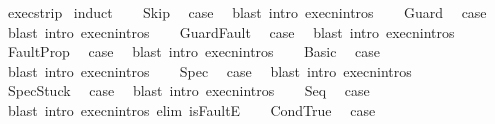 \begin{isabellebody}
\ exec{\isacharunderscore}strip\isanewline
{}\isamarkupfalse%
\ {\isacharparenleft}induct{\isacharparenright}\isanewline
\ \ \isamarkupfalse%
\ Skip\ \isamarkupfalse%
\ {\isacharquery}case\ \isamarkupfalse%
\ {\isacharparenleft}blast\ intro{\isacharcolon}\ execn{\isachardot}intros{\isacharparenright}\isanewline
{}\isamarkupfalse%
\isanewline
\ \ \isamarkupfalse%
\ Guard\ \isamarkupfalse%
\ {\isacharquery}case\ \isamarkupfalse%
\ {\isacharparenleft}blast\ intro{\isacharcolon}\ execn{\isachardot}intros{\isacharparenright}\isanewline
{}\isamarkupfalse%
\isanewline
\ \ \isamarkupfalse%
\ GuardFault\ \isamarkupfalse%
\ {\isacharquery}case\ \isamarkupfalse%
\ {\isacharparenleft}blast\ intro{\isacharcolon}\ execn{\isachardot}intros{\isacharparenright}\isanewline
{}\isamarkupfalse%
\isanewline
\ \ \isamarkupfalse%
\ FaultProp\ \isamarkupfalse%
\ {\isacharquery}case\ \isamarkupfalse%
\ {\isacharparenleft}blast\ intro{\isacharcolon}\ execn{\isachardot}intros{\isacharparenright}\isanewline
{}\isamarkupfalse%
\isanewline
\ \ \isamarkupfalse%
\ Basic\ \isamarkupfalse%
\ {\isacharquery}case\ \isamarkupfalse%
\ {\isacharparenleft}blast\ intro{\isacharcolon}\ execn{\isachardot}intros{\isacharparenright}\isanewline
{}\isamarkupfalse%
\isanewline
\ \ \isamarkupfalse%
\ Spec\ \isamarkupfalse%
\ {\isacharquery}case\ \isamarkupfalse%
\ {\isacharparenleft}blast\ intro{\isacharcolon}\ execn{\isachardot}intros{\isacharparenright}\isanewline
{}\isamarkupfalse%
\isanewline
\ \ \isamarkupfalse%
\ SpecStuck\ \isamarkupfalse%
\ {\isacharquery}case\ \isamarkupfalse%
\ {\isacharparenleft}blast\ intro{\isacharcolon}\ execn{\isachardot}intros{\isacharparenright}\isanewline
{}\isamarkupfalse%
\isanewline
\ \ \isamarkupfalse%
\ Seq\ \isamarkupfalse%
\ {\isacharquery}case\ \isamarkupfalse%
\ {\isacharparenleft}blast\ intro{\isacharcolon}\ execn{\isachardot}intros\ elim{\isacharcolon}\ isFaultE{\isacharparenright}\isanewline
{}\isamarkupfalse%
\isanewline
\ \ \isamarkupfalse%
\ CondTrue\ \isamarkupfalse%
\ {\isacharquery}case\ \isamarkupfalse%

\end{isabellebody}
